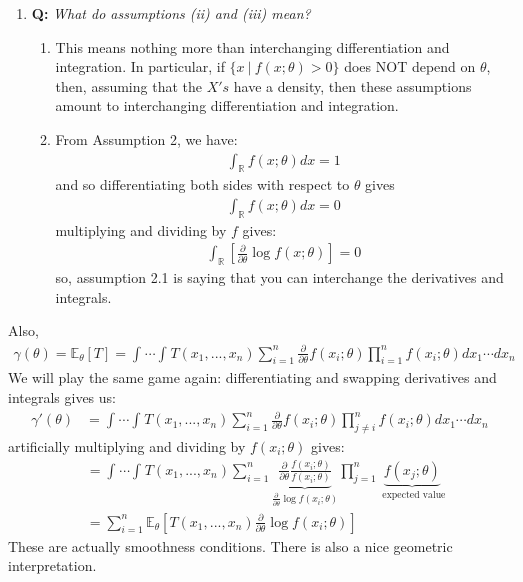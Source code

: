 \documentclass[11pt]{scrartcl}
\newcommand{\R}[0]{\mathbb{R}}
\theoremstyle{definition}
\theoremstyle{remark}
\newcommand{\EXth}[1]{\mathbb{E}_\theta \left[ #1 \right]}
\newcommand{\idx}[2]{\int_{#1}^{#2}}
\begin{document}
{\begin{enumerate}[noitemsep]
	\item \textbf{Q:} \emph{ What do assumptions (ii) and (iii) mean? } 
	\begin{enumerate}[noitemsep]
		\item This means nothing more than interchanging differentiation and integration. In particular, if $\{ x\ |\ f(x; \theta) > 0 \}$ does NOT depend on $\theta$, then, assuming that the $X's$ have a density, then these assumptions amount to interchanging differentiation and integration. 
		\item From Assumption 2, we have: 
		\begin{align*}
			\idx{\R}{} f(x; \theta)dx = 1 	
		\end{align*}
		and so differentiating both sides with respect to $\theta$ gives
		\begin{align*}
			\idx{\R}{} f(x; \theta) dx = 0 	
		\end{align*}
		multiplying and dividing by $f$ gives: 
		\begin{align*}
			\idx{\R}{} \left[ \frac{\partial}{\partial \theta} \log f(x;  \theta) 	 	\right] 	= 0 
		\end{align*}
			so, assumption 2.1 is saying that you can interchange the derivatives and integrals. 
	\end{enumerate}
\end{enumerate}	

Also, 
\begin{align*}
	\gamma ( \theta ) = \EXth{T} = \idx{}{} \cdots \idx{}{} T(x_1, ..., x_n) \sum_{i=1}^n \frac{\partial}{\partial \theta} f(x_i; \theta) \prod_{i=1}^n f(x_i; \theta) dx_1 \cdots d x_n 	
\end{align*}
We will play the same game again: differentiating and swapping derivatives and integrals gives us: 
\begin{align*}
		\gamma' ( \theta ) & =  \idx{}{} \cdots \idx{}{} T(x_1, ..., x_n) \sum_{i=1}^n \frac{\partial}{\partial \theta} f(x_i; \theta) \prod_{j \neq i}^n f(x_i; \theta) dx_1 \cdots d x_n	
\end{align*}
artificially multiplying and dividing by $f(x_i; \theta)$ gives: 
\begin{align*}
	& = \idx{}{} \cdots \idx{}{} T(x_1, ..., x_n ) \sum_{i=1}^n \underbrace{\frac{\partial}{\partial \theta} \frac{ f(x_i; \theta) 	}{f(x_i; \theta)}}_{\frac{\partial}{\partial \theta} \log f(x_i; \theta)} \prod_{j=1}^n \underbrace{f(x_j; \theta)}_{\text{ expected value}} \\
	& = \sum_{i=1}^n \EXth{T(x_1, ..., x_n) \frac{\partial}{\partial \theta} \log f(x_i; \theta) } 
\end{align*}
These are actually smoothness conditions. There is also a nice geometric interpretation. 

}
\end{document}
